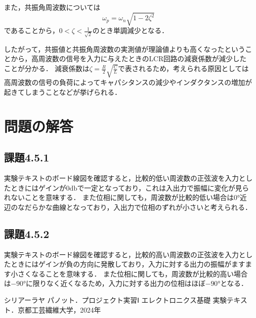\documentclass{jlreq}
\numberwithin{equation}{section}
\begin{document}
また，共振角周波数については
\begin{equation}
  \omega_p = \omega_n \sqrt{1-2\zeta^2}
\end{equation}
であることから，$0 < \zeta < \frac{1}{\sqrt{2}}$のとき単調減少となる．

したがって，共振値と共振角周波数の実測値が理論値よりも高くなったということから，高周波数の信号を入力に与えたときのLCR回路の減衰係数が減少したことが分かる．
減衰係数は$\zeta = \frac{R}{2} \sqrt{\frac{C}{L}}$で表されるため，考えられる原因としては高周波数の信号の負荷によってキャパシタンスの減少やインダクタンスの増加が起きてしまうことなどが挙げられる．

\section{問題の解答}
\subsection*{課題4.5.1}
実験テキストのボード線図を確認すると，比較的低い周波数の正弦波を入力としたときにはゲインが$0 \si{\decibel}$で一定となっており，これは入出力で振幅に変化が見られないことを意味する．
また位相に関しても，周波数が比較的低い場合は$0 \si{\degree}$近辺のなだらかな曲線となっており，入出力で位相のずれが小さいと考えられる．

\subsection*{課題4.5.2}
実験テキストのボード線図を確認すると，比較的高い周波数の正弦波を入力としたときにはゲインが負の方向に発散しており，入力に対する出力の振幅がますます小さくなることを意味する．
また位相に関しても，周波数が比較的高い場合は$-90 \si{\degree}$に限りなく近くなるため，入力に対する出力の位相はほぼ$-90 \si{\degree}$となる．

\begin{thebibliography}{9}
  \item シリアーラヤ パノット．プロジェクト実習Ⅰ エレクトロニクス基礎 実験テキスト．京都工芸繊維大学，2024年
\end{thebibliography}
\end{document}
